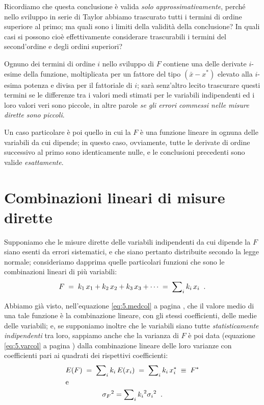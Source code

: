 Ricordiamo che questa conclusione \`e valida \emph{solo
  approssimativamente}, perch\'e nello sviluppo in serie di
Taylor abbiamo trascurato tutti i termini di ordine
superiore al primo; ma quali sono i limiti della validit\`a
della conclusione?  In quali casi si possono cio\`e
effettivamente considerare trascurabili i termini del
second'ordine e degli ordini superiori?

Ognuno dei termini di ordine $i$ nello sviluppo di $F$
contiene una delle derivate $i$-esime della funzione,
moltiplicata per un fattore del tipo $ ( \bar x - x^* ) $
elevato alla $i$-esima potenza e divisa per il fattoriale di
$i$; sar\`a senz'altro lecito trascurare questi termini se
le differenze tra i valori medi stimati per le variabili
indipendenti ed i loro valori veri sono piccole, in altre
parole \emph{se gli errori commessi nelle misure dirette
  sono piccoli}.

Un caso particolare \`e poi quello in cui la $F$ \`e una
funzione lineare in ognuna delle variabili da cui dipende;
in questo caso, ovviamente, tutte le derivate di ordine
successivo al primo sono identicamente nulle, e le
conclusioni precedenti sono valide \emph{esattamente}.

\section{Combinazioni lineari di misure dirette}
Supponiamo che le misure dirette delle variabili
indipendenti da cui dipende la $F$ siano esenti da errori
sistematici, e che siano pertanto distribuite secondo la
legge normale; consideriamo dapprima quelle particolari
funzioni che sono le combinazioni lineari di pi\`u
variabili:
\begin{equation*}
  F \; = \; k_1 \, x_1 + k_2 \, x_2 + k_3 \, x_3
    +\cdots \; = \; \sum \nolimits_i k_i \, x_i \;\; .
\end{equation*}

Abbiamo gi\`a visto, nell'equazione \eqref{eq:5.medcol} a
pagina \pageref{eq:5.medcol}, che il valore medio di una
tale funzione \`e la combinazione lineare, con gli stessi
coefficienti, delle medie delle variabili; e, se supponiamo
inoltre che le variabili siano tutte \emph{statisticamente
  indipendenti} tra loro, sappiamo anche che la varianza di
$F$ \`e poi data (equazione \eqref{eq:5.varcol} a pagina
\pageref{eq:5.varcol}) dalla combinazione lineare delle loro
varianze con coefficienti pari ai quadrati dei rispettivi
coefficienti:
\begin{gather*}
  E(F) \; = \; \sum \nolimits_i k_i \, E ( x_i )
  \; = \; \sum \nolimits_i k_i \, x_i^*
  \; \equiv \; F^* \\
  \intertext{e}
  {\sigma_F}^2 = \sum \nolimits_i {k_i}^2 {\sigma_i}^2 \;\; .
\end{gather*}

